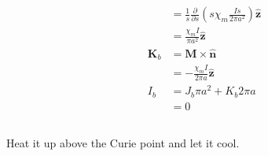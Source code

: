 \documentclass{article}
\renewcommand{\vec}[1]{\boldsymbol{\mathbf{#1}}}
\newcommand{\uvec}[1]{\hat{\vec{#1}}}
\begin{document}
\begin{align*}
                                          & = \frac{1}{s} \frac{\partial}{\partial s} \left( s \chi_m \frac{I s}{2 \pi a^2} \right) \uvec{z} \\
                                          & = \frac{\chi_m I}{\pi a^2} \uvec{z}                                                              \\
  \vec{K}_b                               & = \vec{M} \times \uvec{n}                                                                        \\
                                          & = -\frac{\chi_m I}{2 \pi a} \uvec{z}                                                             \\
  I_b                                     & = J_b \pi a^2 + K_b 2 \pi a                                                                      \\
                                          & = 0
\end{align*}

\setcounter{subsection}{19}
\subsection{}

Heat it up above the Curie point and let it cool.

\subsection{}
\end{document}
